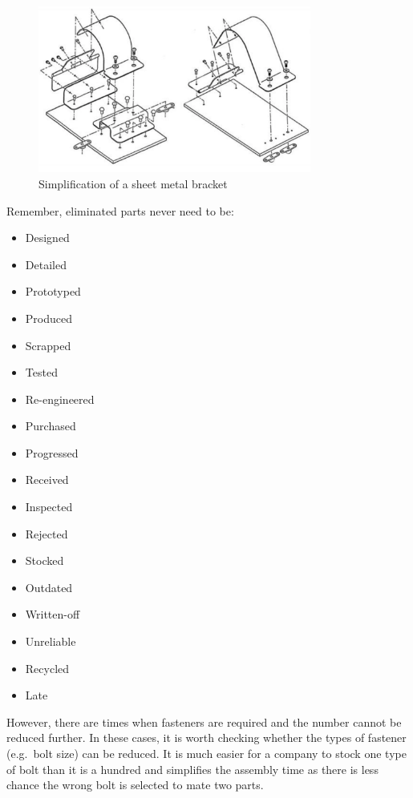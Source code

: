 \begin{figure}[t!]
  \centering
  \includegraphics[width=0.8\textwidth]{07_design_for_x/simplification.png}
  \caption{Simplification of a sheet metal bracket}\label{fig-bracket}
\end{figure}


Remember, eliminated parts never need to be:

\begin{multicols}{3}
    \begin{itemize}
        \item Designed
        \item Detailed
        \item Prototyped
        \item Produced
        \item Scrapped
        \item Tested
        \item Re-engineered
        \item Purchased
        \item Progressed
        \item Received
        \item Inspected
        \item Rejected
        \item Stocked
        \item Outdated
        \item Written-off
        \item Unreliable
        \item Recycled
        \item Late
    \end{itemize}
\end{multicols}

However, there are times when fasteners are required and the number cannot be reduced further. In these cases, it is worth checking whether the types of fastener (e.g.\ bolt size) can be reduced. It is much easier for a company to stock one type of bolt than it is a hundred and simplifies the assembly time as there is less chance the wrong bolt is selected to mate two parts.

